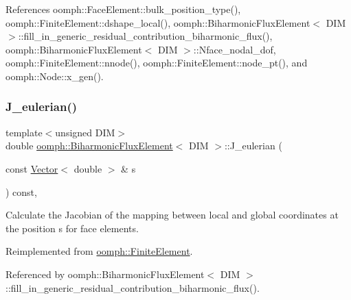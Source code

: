 References oomph\+::\+Face\+Element\+::bulk\+\_\+position\+\_\+type(), oomph\+::\+Finite\+Element\+::dshape\+\_\+local(), oomph\+::\+Biharmonic\+Flux\+Element$<$ D\+I\+M $>$\+::fill\+\_\+in\+\_\+generic\+\_\+residual\+\_\+contribution\+\_\+biharmonic\+\_\+flux(), oomph\+::\+Biharmonic\+Flux\+Element$<$ D\+I\+M $>$\+::\+Nface\+\_\+nodal\+\_\+dof, oomph\+::\+Finite\+Element\+::nnode(), oomph\+::\+Finite\+Element\+::node\+\_\+pt(), and oomph\+::\+Node\+::x\+\_\+gen().

\mbox{\label{classoomph_1_1BiharmonicFluxElement_a17313d4bf33a00c472f90e2fe7b6efea}} 
\subsubsection{\texorpdfstring{J\+\_\+eulerian()}{J\_eulerian()}\hspace{0.1cm}{\footnotesize\ttfamily [2/2]}}
{\footnotesize\ttfamily template$<$unsigned D\+IM$>$ \\
double \hyperlink{classoomph_1_1BiharmonicFluxElement}{oomph\+::\+Biharmonic\+Flux\+Element}$<$ D\+IM $>$\+::J\+\_\+eulerian (\begin{DoxyParamCaption}\item[{const \hyperlink{classoomph_1_1Vector}{Vector}$<$ double $>$ \&}]{s }\end{DoxyParamCaption}) const\hspace{0.3cm}{\ttfamily [private]}, {\ttfamily [virtual]}}



Calculate the Jacobian of the mapping between local and global coordinates at the position s for face elements. 



Reimplemented from \hyperlink{classoomph_1_1FiniteElement_a089e58d5ad9b8efee637221b0e264563}{oomph\+::\+Finite\+Element}.



Referenced by oomph\+::\+Biharmonic\+Flux\+Element$<$ D\+I\+M $>$\+::fill\+\_\+in\+\_\+generic\+\_\+residual\+\_\+contribution\+\_\+biharmonic\+\_\+flux().

\mbox{\label{classoomph_1_1BiharmonicFluxElement_a6e2481c449904d5c9a877d4233f3e9a2}} 
